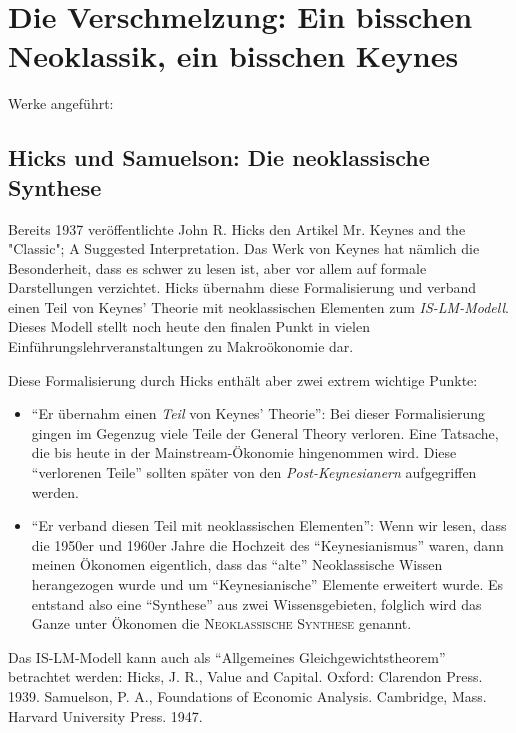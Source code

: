 %
%
%

\chapter{Die Verschmelzung: Ein bisschen Neoklassik, ein bisschen Keynes}
\label{Synthese}

Werke angeführt: \parencite[S. 57]{Snowdon2005}

\section{Hicks und Samuelson: Die neoklassische Synthese}


Bereits 1937 veröffentlichte John R. Hicks den Artikel Mr. Keynes and the "Classic"; A Suggested Interpretation. Das Werk von Keynes hat nämlich die Besonderheit, dass es schwer zu lesen ist, aber vor allem auf formale Darstellungen verzichtet. Hicks übernahm diese Formalisierung und verband einen Teil von Keynes' Theorie mit neoklassischen Elementen zum \textit{IS-LM-Modell}. Dieses Modell stellt noch heute den finalen Punkt in vielen Einführungslehrveranstaltungen zu Makroökonomie dar.

Diese Formalisierung durch Hicks enthält aber zwei extrem wichtige Punkte:
\begin{itemize}
	\item "`Er übernahm einen \textit{Teil} von Keynes' Theorie"': Bei dieser Formalisierung gingen im Gegenzug viele Teile der General Theory verloren. Eine Tatsache, die bis heute in der Mainstream-Ökonomie hingenommen wird. Diese "`verlorenen Teile"' sollten später von den \textit{Post-Keynesianern} aufgegriffen werden.
	\item "`Er verband diesen Teil mit neoklassischen Elementen"': Wenn wir lesen, dass die 1950er und 1960er Jahre die Hochzeit des "`Keynesianismus"' waren, dann meinen Ökonomen eigentlich, dass das "`alte"' Neoklassische Wissen herangezogen wurde und um "`Keynesianische"' Elemente erweitert wurde. Es entstand also eine "`Synthese"' aus zwei Wissensgebieten, folglich wird das Ganze unter Ökonomen die \textsc{Neoklassische Synthese} genannt.
\end{itemize}



Das IS-LM-Modell kann auch als "`Allgemeines Gleichgewichtstheorem"' betrachtet werden:
Hicks, J. R., Value and Capital. Oxford: Clarendon Press. 1939.
Samuelson, P. A., Foundations of Economic Analysis. Cambridge, Mass. Harvard University Press. 1947.


